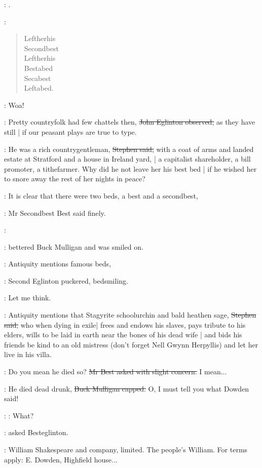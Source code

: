 \StephenInt:
.

\StephenInt:
\begin{verse}
    Leftherhis \\
    Secondbest \\
    Leftherhis \\
    Bestabed \\
    Secabest \\
    Leftabed.
\end{verse}

\StephenInt:
Woa!

\eglinton:
Pretty countryfolk had few chattels then,
\sout{John Eglinton observed,}
as they have still |
if our peasant plays are true to type.

\Stephen:
He was a rich countrygentleman,
\sout{Stephen said,}
with a coat of arms and landed estate at Stratford and a house in Ireland yard, |
a capitalist shareholder,
a bill promoter,
a tithefarmer.
Why did he not leave her his best bed |
if he wished her to snore away the rest of her nights in peace?

\best:
It is clear that there were two beds,
a best and a secondbest,

:
Mr Secondbest Best said finely.

\mulligan:

:
bettered Buck Mulligan and was smiled on.

\eglinton:
Antiquity mentions famous beds,

:
Second Eglinton puckered, bedsmiling.

\eglinton:
Let me think.

\Stephen:
Antiquity mentions
that Stagyrite schoolurchin and bald heathen sage,
\sout{Stephen said,}
who when dying in exile|
frees and endows his slaves,
pays tribute to his elders,
wills to be laid in earth near the bones of his dead wife |
and bids his friends be kind to an old mistress
(don't forget Nell Gwynn Herpyllis)
and let her live in his villa.

\best:
Do you mean he died so?
\sout{Mr Best asked with slight concern.}
I mean...

\mulligan:
He died dead drunk,
\sout{Buck Mulligan capped.}
O, I must tell you what Dowden said!

\best:
\eglinton:
What?

:
asked Besteglinton.

\StephenInt:
William Shakespeare and company, limited.
The people's William.
For terms apply:
E. Dowden,
Highfield house...

